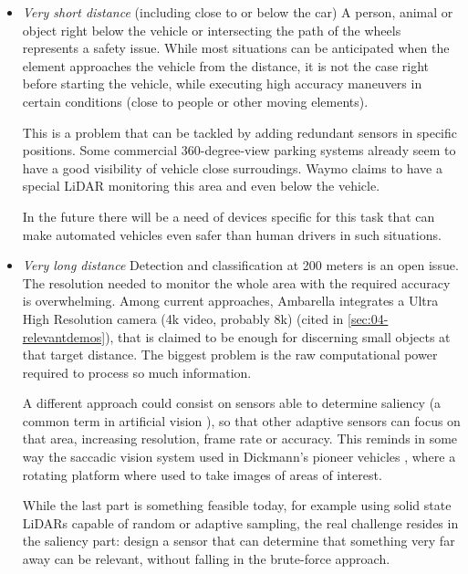\begin{itemize}
    \item \emph{Very short distance} (including close to or below the 
    car)
        A person, animal or object right below the vehicle or intersecting 
        the path of the wheels represents a safety issue. While most situations
        can be anticipated when the element approaches the vehicle from the
        distance, it is not the case right before starting the vehicle, 
        while executing high accuracy maneuvers in certain conditions 
        (close to people or other moving elements).  
        
        This is a problem that can be tackled by adding redundant sensors in 
        specific positions. Some commercial 360-degree-view parking systems 
        \cite{gandhi2006vehicle} already seem to have a good visibility of vehicle close 
        surroudings. Waymo claims to have a special LiDAR monitoring this area
        and even below the vehicle. 
        
        In the future there will be a need of devices specific for this task 
        that can make automated vehicles even safer than human drivers in such 
        situations.
          
    \item \emph{Very long distance} 
        Detection and classification at 200 meters is an open issue.
        The resolution needed to monitor the whole area with the required 
        accuracy is overwhelming. Among current approaches, Ambarella 
        integrates a Ultra High Resolution camera (4k video, probably 8k) 
        (cited in \ref{sec:04-relevantdemos}), that is claimed to be enough for 
        discerning small objects at that target distance. The biggest problem
        is the raw computational power required to process so much information.
        
        A different approach could consist on sensors able to determine 
        saliency (a common term in artificial vision 
        \cite{Zhang2016a,Palazzi2018,Duthon2016}), 
        so that other adaptive sensors can focus on that area, increasing
        resolution, frame rate or accuracy. 
        This reminds in some way the saccadic vision system used in Dickmann's 
        pioneer vehicles \cite{Dickmanns1987,Gregor2002}, where a rotating 
        platform where used to take images of areas of interest.
        
        While the last part is something feasible today, for example using solid
        state LiDARs capable of random or adaptive sampling, the real challenge
        resides in the saliency part: design a sensor that can determine that 
        something very far away can be relevant, without falling in the
        brute-force approach.
        

\end{itemize}
